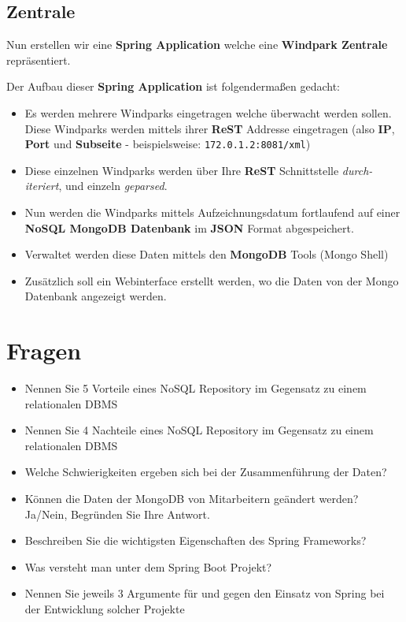 \clearpage
\subsection{Zentrale}

Nun erstellen wir eine \textbf{Spring Application} welche eine \textbf{Windpark Zentrale} repräsentiert.

Der Aufbau dieser \textbf{Spring Application} ist folgendermaßen gedacht:

\begin{itemize}
    \item Es werden mehrere Windparks eingetragen welche überwacht werden sollen. Diese Windparks werden mittels ihrer \textbf{ReST} Addresse eingetragen (also \textbf{IP}, \textbf{Port} und \textbf{Subseite} - beispielsweise: \texttt{172.0.1.2:8081/xml})
    \item Diese einzelnen Windparks werden über Ihre \textbf{ReST} Schnittstelle \textit{durch-iteriert}, und einzeln \textit{geparsed}.
    \item Nun werden die Windparks mittels Aufzeichnungsdatum fortlaufend auf einer \textbf{NoSQL MongoDB Datenbank} im \textbf{JSON} Format abgespeichert.
    \item Verwaltet werden diese Daten mittels den \textbf{MongoDB} Tools (Mongo Shell)
    \item Zusätzlich soll ein Webinterface erstellt werden, wo die Daten von der Mongo Datenbank angezeigt werden.
\end{itemize}




\clearpage
\section{Fragen}

\begin{itemize}
    \item Nennen Sie 5 Vorteile eines NoSQL Repository im Gegensatz zu einem relationalen DBMS
    \item Nennen Sie 4 Nachteile eines NoSQL Repository im Gegensatz zu einem relationalen DBMS
    \item Welche Schwierigkeiten ergeben sich bei der Zusammenführung der Daten?
    \item Können die Daten der MongoDB von Mitarbeitern geändert werden?
        Ja/Nein, Begründen Sie Ihre Antwort.
    \item Beschreiben Sie die wichtigsten Eigenschaften des Spring Frameworks?
    \item Was versteht man unter dem Spring Boot Projekt?
    \item Nennen Sie jeweils 3 Argumente für und gegen den Einsatz von Spring bei der Entwicklung solcher Projekte
\end{itemize}
